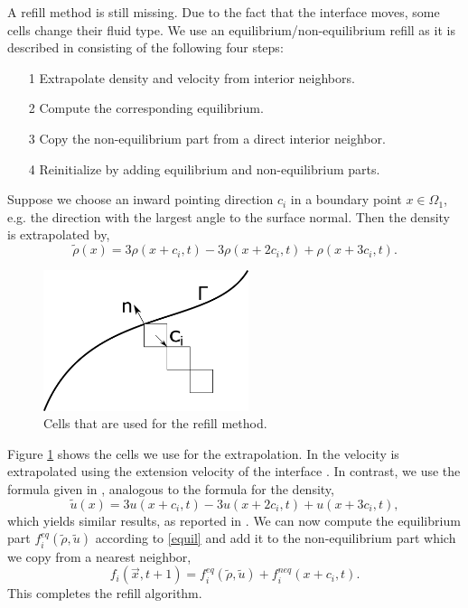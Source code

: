 \documentclass[final,leqno,onefignum,onetabnum]{siamltexmm}
\begin{document}
A refill method is still missing. Due to the fact that the interface moves, some cells change their fluid type. We use an equilibrium/non-equilibrium refill as it is described in \cite{Caiazzo} consisting of the following four steps:
\begin{itemize}
	\item[1] Extrapolate density and velocity from interior neighbors.
	\item[2] Compute the corresponding equilibrium.
	\item[3] Copy the non-equilibrium part from a direct interior neighbor.
	\item[4] Reinitialize by adding equilibrium and non-equilibrium parts.
\end{itemize}
Suppose we choose an inward pointing direction $c_i$ in a boundary point $x \in \Omega_1$, e.g. the direction with the largest angle to the surface normal. Then the density is extrapolated by,
\begin{equation}
  \tilde{\rho}(x) = 3\rho(x+c_i,t) - 3\rho(x+2c_i,t) + \rho(x+3c_i,t).
\end{equation}
\begin{figure}[h]
	\hfill\includegraphics[width=6cm,natwidth=445,natheight=305]{refillmethod.png}\hspace*{\fill}
	\caption{Cells that are used for the refill method.}
	\label{refill}
\end{figure}
Figure \ref{refill} shows the cells we use for the extrapolation. In \cite{Thoemmes} the velocity is extrapolated using the extension velocity of the interface \cite{Adalsteinsson}. In contrast, we use the formula given in \cite{Lallemand}, analogous to the formula for the density,
\begin{equation}
  \tilde{u}(x) = 3u(x+c_i,t) - 3u(x+2c_i,t) + u(x+3c_i,t),
\end{equation}
which yields similar results, as reported in \cite{Lallemand}.
We can now compute the equilibrium part $f_i^{eq}(\tilde{\rho},\tilde{u})$ according to \cref{equil} and add it to the non-equilibrium part which we copy from a nearest neighbor,
$$f_i(\vec{x},t+1) = f_i^{eq}(\tilde{\rho},\tilde{u}) + f_i^{neq}(x+c_i,t) \text{.}$$
This completes the refill algorithm.
\end{document}
